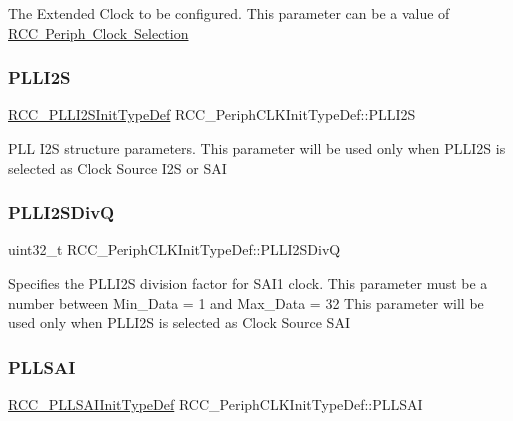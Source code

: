 The Extended Clock to be configured. This parameter can be a value of \mbox{\hyperlink{group___r_c_c_ex___periph___clock___selection}{R\+CC Periph Clock Selection}} \mbox{\label{struct_r_c_c___periph_c_l_k_init_type_def_acc2f1ab5bca1f524c6dc9f7b8dce747d}} 
\subsubsection{\texorpdfstring{PLLI2S}{PLLI2S}}
{\footnotesize\ttfamily \mbox{\hyperlink{struct_r_c_c___p_l_l_i2_s_init_type_def}{R\+C\+C\+\_\+\+P\+L\+L\+I2\+S\+Init\+Type\+Def}} R\+C\+C\+\_\+\+Periph\+C\+L\+K\+Init\+Type\+Def\+::\+P\+L\+L\+I2S}

P\+LL I2S structure parameters. This parameter will be used only when P\+L\+L\+I2S is selected as Clock Source I2S or S\+AI \mbox{\label{struct_r_c_c___periph_c_l_k_init_type_def_a158247326a43b3ce7eb1d2907ced6234}} 
\subsubsection{\texorpdfstring{PLLI2SDivQ}{PLLI2SDivQ}}
{\footnotesize\ttfamily uint32\+\_\+t R\+C\+C\+\_\+\+Periph\+C\+L\+K\+Init\+Type\+Def\+::\+P\+L\+L\+I2\+S\+DivQ}

Specifies the P\+L\+L\+I2S division factor for S\+A\+I1 clock. This parameter must be a number between Min\+\_\+\+Data = 1 and Max\+\_\+\+Data = 32 This parameter will be used only when P\+L\+L\+I2S is selected as Clock Source S\+AI \mbox{\label{struct_r_c_c___periph_c_l_k_init_type_def_a5bfc6178ab362422276fcc36be9ba7a9}} 
\subsubsection{\texorpdfstring{PLLSAI}{PLLSAI}}
{\footnotesize\ttfamily \mbox{\hyperlink{struct_r_c_c___p_l_l_s_a_i_init_type_def}{R\+C\+C\+\_\+\+P\+L\+L\+S\+A\+I\+Init\+Type\+Def}} R\+C\+C\+\_\+\+Periph\+C\+L\+K\+Init\+Type\+Def\+::\+P\+L\+L\+S\+AI}

